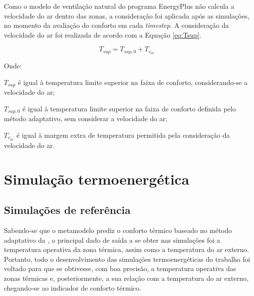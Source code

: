 \documentclass[brazil,hardcopy,openany,a5paper]{ufscthesis}
\begin{document}
		Como o modelo de ventilação natural do programa EnergyPlus não calcula a velocidade do ar dentro das zonas, a consideração foi aplicada após as simulações, no momento da avaliação do conforto em cada \textit{timestep}. A consideração da velocidade do ar foi realizada de acordo com a Equação \ref{eq:Tsup}.
		
		\begin{equation}
		\label{eq:Tsup}
		T_{sup} = T_{sup,0} + T_{v_{ar}}
		\end{equation}
		
		Onde:
		
		$T_{sup}$ é igual à temperatura limite superior na faixa de conforto, considerando-se a velocidade do ar;
		
		$T_{sup,0}$ é igual à temperatura limite superior na faixa de conforto definida pelo método adaptativo, sem considerar a velocidade do ar;
		
		$T_{v_{ar}}$ é igual à margem extra de temperatura permitida pela consideração da velocidade do ar.
		\\
		
		\section{Simulação termoenergética}
		
		\subsection{Simulações de referência}
		
		Sabendo-se que o metamodelo prediz o conforto térmico baseado no método adaptativo da  \cite{ASHRAEStandard552017}, o principal dado de saída a se obter nas simulações foi a temperatura operativa da zona térmica, assim como a temperatura do ar externo. Portanto, todo o desenvolvimento das simulações termoenergéticas do trabalho foi voltado para que se obtivesse, com boa precisão, a temperatura operativa das zonas térmicas e, posteriormente, a sua relação com a temperatura do ar externo, chegando-se ao indicador de conforto térmico.
		
\end{document}
